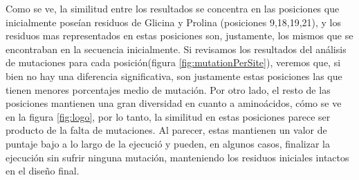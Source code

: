 Como se ve, la similitud entre los resultados se concentra en las posiciones que inicialmente  
poseían residuos de Glicina y Prolina (posiciones 9,18,19,21), y los residuos mas representados en estas posiciones son, justamente, los mismos que se encontraban en la secuencia inicialmente. 
Si revisamos los resultados del análisis de mutaciones para cada posición(figura \ref{fig:mutationPerSite}), veremos que, si bien no hay una diferencia significativa, 
son justamente estas posiciones las que tienen menores porcentajes medio de mutación.
Por otro lado, el resto de las posiciones mantienen una gran diversidad en cuanto a aminoácidos, cómo se ve en la figura \ref{fig:logo},
por lo tanto, la similitud en estas posiciones parece ser producto de la falta de mutaciones.
Al parecer, estas mantienen un valor de puntaje bajo a lo largo de la ejecució y pueden, en algunos casos, finalizar la ejecución sin sufrir ninguna mutación, manteniendo los residuos iniciales intactos en el diseño final.





